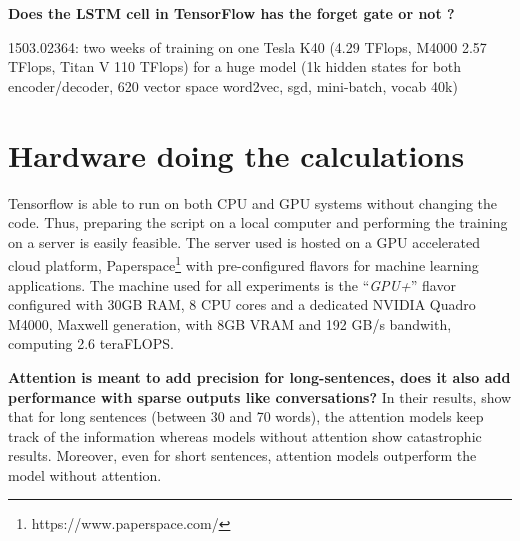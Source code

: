 \textbf{Does the LSTM cell in TensorFlow has the forget gate or not ?}

1503.02364: two weeks of training on one Tesla K40 (4.29 TFlops, M4000 2.57 TFlops, Titan V 110 TFlops) for a huge model (1k hidden states for both encoder/decoder, 620 vector space word2vec, sgd, mini-batch, vocab 40k)

\section{Hardware doing the calculations}
Tensorflow is able to run on both CPU and GPU systems without changing the code. Thus, preparing the script on a local computer and performing the training on a server is
easily feasible. The server used is hosted on a GPU accelerated cloud platform, Paperspace\footnote{https://www.paperspace.com/} with pre-configured flavors for machine learning applications. The machine used for all experiments is the ``\textit{GPU+}'' flavor configured with 30GB RAM, 8 CPU cores and a dedicated NVIDIA Quadro M4000, Maxwell generation, with 8GB VRAM and 192 GB/s bandwith, computing 2.6 teraFLOPS.


\textbf{Attention is meant to add precision for long-sentences, does it also add performance with sparse outputs like conversations?}
In their results, \citet{1508.04025} show that for long sentences (between 30 and 70 words), the attention models keep track of the information whereas models without attention show catastrophic results. Moreover, even for short sentences, attention models outperform the model without attention.
